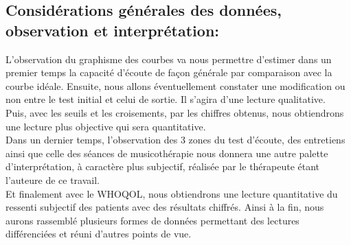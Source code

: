 \subsection {Considérations générales des données, observation et interprétation: }
L'observation du graphisme des courbes va nous permettre d'estimer dans un premier temps la capacité 
d'écoute de 
façon générale par comparaison avec la courbe idéale.
 Ensuite, nous allons éventuellement constater une modification ou non entre le test initial  
et celui de sortie.   
Il s'agira  d'une lecture qualitative. 
\\
Puis, avec les seuils et les croisements, par les chiffres obtenus, nous obtiendrons une lecture plus 
objective  
qui sera quantitative.
\\
Dans un dernier temps, l'observation des 3 zones du test d'écoute, des entretiens ainsi que celle  des 
séances de 
musicothérapie nous donnera une autre palette d'interprétation, à caractère plus subjectif, réalisée par le 
thérapeute étant  l'auteure de ce travail.
\\
Et finalement avec le WHOQOL, nous obtiendrons une lecture quantitative du ressenti subjectif des 
patients avec des résultats chiffrés.
Ainsi à la fin, nous aurons rassemblé plusieurs formes de données permettant des lectures différenciées 
et réuni  d'autres points de vue.



